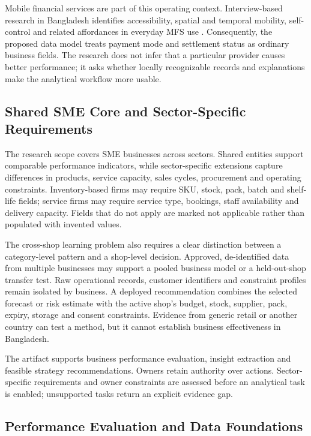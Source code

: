 Mobile financial services are part of this operating context. Interview-based
research in Bangladesh identifies accessibility, spatial and temporal mobility,
self-control and related affordances in everyday MFS use
\cite{hazra2021mfs}. Consequently, the proposed data model treats payment mode
and settlement status as ordinary business fields. The research does not infer
that a particular provider causes better performance; it asks whether locally
recognizable records and explanations make the analytical workflow more usable.

\subsection{Shared SME Core and Sector-Specific Requirements}

The research scope covers SME businesses across sectors. Shared entities
support comparable performance indicators, while sector-specific extensions
capture differences in products, service capacity, sales cycles, procurement
and operating constraints. Inventory-based firms may require SKU, stock, pack,
batch and shelf-life fields; service firms may require service type, bookings,
staff availability and delivery capacity. Fields that do not apply are marked
not applicable rather than populated with invented values.

The cross-shop learning problem also requires a clear distinction between a
category-level pattern and a shop-level decision. Approved, de-identified data
from multiple businesses may support a pooled business model or a held-out-shop
transfer test. Raw operational records, customer identifiers and constraint
profiles remain isolated by business. A deployed recommendation combines the
selected forecast or risk estimate with the active shop's budget, stock,
supplier, pack, expiry, storage and consent constraints. Evidence from generic
retail or another country can test a method, but it cannot establish business
effectiveness in Bangladesh.

The artifact supports business performance evaluation, insight extraction
and feasible strategy recommendations. Owners retain authority over actions.
Sector-specific requirements and owner constraints are assessed before an
analytical task is enabled; unsupported tasks return an explicit evidence gap.

\subsection{Performance Evaluation and Data Foundations}

